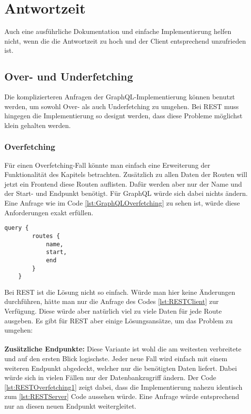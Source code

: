 \section{Antwortzeit}

Auch eine ausführliche Dokumentation und einfache Implementierung helfen nicht, wenn die die Antwortzeit zu hoch und der Client entsprechend unzufrieden ist.

\subsection{Over- und Underfetching}\label{OverUnderfetching}

Die komplizierteren Anfragen der GraphQL-Implementierung können benutzt werden, um sowohl Over- als auch Underfetching zu umgehen. Bei \ac{REST} muss hingegen die Implementierung so designt werden, dass diese Probleme möglichst klein gehalten werden. 

\subsubsection{Overfetching} Für einen Overfetching-Fall könnte man einfach eine Erweiterung der Funktionalität des Kapitels  betrachten. Zusätzlich zu allen Daten der Routen will jetzt ein Frontend diese Routen auflisten. Dafür werden aber nur der Name und der Start- und Endpunkt benötigt. Für GraphQL würde sich dabei nichts ändern. Eine Anfrage wie im Code \ref{lst:GraphQLOverfetching} zu sehen ist, würde diese Anforderungen exakt erfüllen.

\begin{minipage}{\linewidth}
\begin{lstlisting}[caption={Client Anfrage welche nur drei Felder pro Route zurückgibt},captionpos=b,label=lst:GraphQLOverfetching] 
	query { 
		routes { 
			name, 
			start,
			end
		}
	} 
\end{lstlisting}
\end{minipage}

Bei \ac{REST} ist die Lösung nicht so einfach. Würde man hier keine Änderungen durchführen, hätte man nur die Anfrage des Codes \ref{lst:RESTClient} zur Verfügung. Diese würde aber natürlich viel zu viele Daten für jede Route ausgeben. Es gibt für \ac{REST} aber einige Lösungsansätze, um das Problem zu umgehen:\\
\\
\textbf{Zusätzliche Endpunkte:} Diese Variante ist wohl die am weitesten verbreitete und auf den ersten Blick logischste. Jeder neue Fall wird einfach mit einem weiteren Endpunkt abgedeckt, welcher nur die benötigten Daten liefert. Dabei würde sich in vielen Fällen nur der Datenbankzugriff ändern. Der Code \ref{lst:RESTOverfetching1} zeigt dabei, dass die Implementierung nahezu identisch zum \ref{lst:RESTServer} Code aussehen würde. Eine Anfrage würde entsprechend nur an diesen neuen Endpunkt weitergleitet.\\

